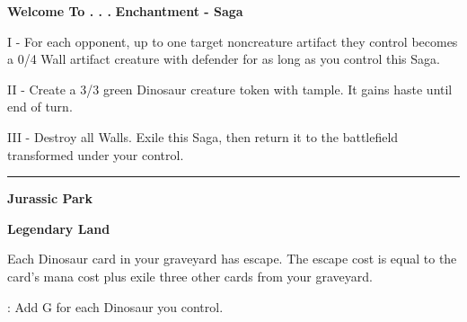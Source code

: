 \documentclass[8pt]{extarticle}
\begin{document}
{\large\textbf{Welcome To . . .}}
\hfill
\1\G\G

\textbf{Enchantment - Saga}

I - For each opponent, up to one target noncreature artifact they control becomes a 0/4 Wall artifact creature with defender for as long as you control this Saga.

II - Create a 3/3 green Dinosaur creature token with tample. It gains haste until end of turn.

III - Destroy all Walls. Exile this Saga, then return it to the battlefield transformed under your control.

\vfill
\hrule
\vfill

{\large\textbf{Jurassic Park}}

\textbf{Legendary Land}

Each Dinosaur card in your graveyard has escape. The escape cost is equal to the card's mana cost plus exile three other cards from your graveyard.

\T: Add {G} for each Dinosaur you control.
\end{document}

